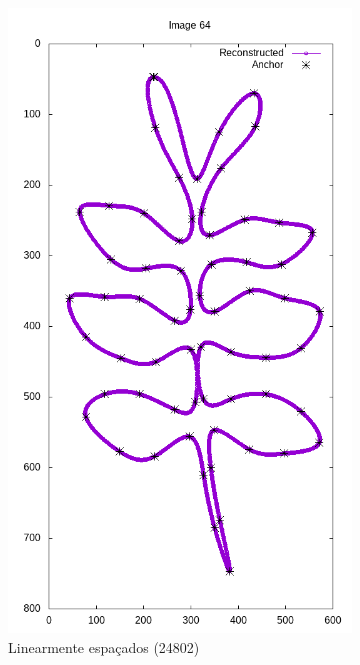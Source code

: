 \begin{frame}
\begin{figure}[ht!]
		\begin{subfigure}[t]{0.24\textwidth}
			\centering
			\includegraphics[width=\textwidth]{img/rec/64lin(24802).png}
			\caption{Linearmente espaçados (24802)}
		\end{subfigure}
		\begin{subfigure}[t]{0.24\textwidth}
			\centering

\end{subfigure}
\end{figure}
\end{frame}

